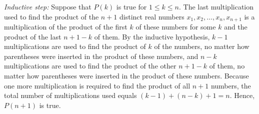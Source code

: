 \documentclass{../../cls/sig-alternate-05-2015}
\begin{document}
\begin{enumerate}
\textit{Inductive step:} Suppose that $P(k)$ is true for $1 \le k \le n$.
The last multiplication used to find the product of the $n + 1$
distinct real numbers $x_1, x_2, \ldots, x_n, x_{n + 1}$ is a multiplication of the product of the first $k$ of these numbers for some $k$ and the product of the last $n + 1 - k$ of them.
By the inductive hypothesis,
$k - 1$ multiplications are used to find the product of $k$ of the numbers,
no matter how parentheses were inserted in the product of these numbers,
and $n - k$ multiplications are used to find the product of the other $n + 1 - k$ of them,
no matter how parentheses were inserted in the product of these
numbers.
Because one more multiplication is required to find the product of all $n + 1$ numbers,
the total number of multiplications used equals $(k - 1) + (n - k) + 1 = n$.
Hence, $P(n + 1)$ is true.

\end{enumerate}
\end{document}
